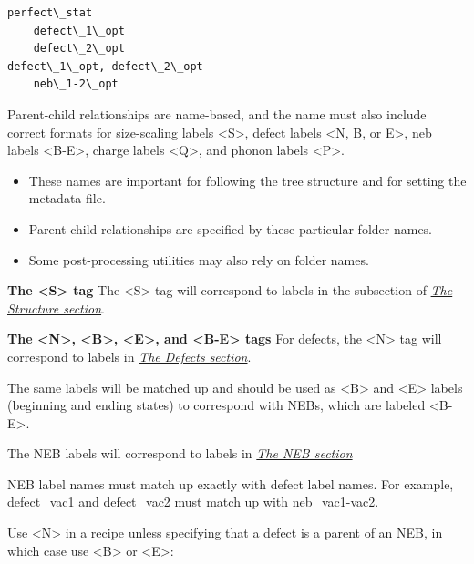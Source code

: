 \documentclass[letterpaper,10pt,english]{sphinxmanual}
\begin{document}
\begin{Verbatim}[commandchars=\\\{\}]
perfect\_stat
    defect\_1\_opt
    defect\_2\_opt
defect\_1\_opt, defect\_2\_opt
    neb\_1-2\_opt
\end{Verbatim}

Parent-child relationships are name-based, and the name must also include correct formats for size-scaling labels \textless{}S\textgreater{}, defect labels \textless{}N, B, or E\textgreater{}, neb labels \textless{}B-E\textgreater{}, charge labels \textless{}Q\textgreater{}, and phonon labels \textless{}P\textgreater{}.
\begin{itemize}
\item {} 
These names are important for following the tree structure and for setting the metadata file.

\item {} 
Parent-child relationships are specified by these particular folder names.

\item {} 
Some post-processing utilities may also rely on folder names.

\end{itemize}

\textbf{The \textless{}S\textgreater{} tag}
The \textless{}S\textgreater{} tag will correspond to labels in the  subsection of {\hyperref[3_1_1_structure::doc]{\emph{The Structure section}}}.

\textbf{The \textless{}N\textgreater{}, \textless{}B\textgreater{}, \textless{}E\textgreater{}, and \textless{}B-E\textgreater{} tags}
For defects, the \textless{}N\textgreater{} tag will correspond to labels in {\hyperref[3_1_5_defects::doc]{\emph{The Defects section}}}.

The same labels will be matched up and should be used as \textless{}B\textgreater{} and \textless{}E\textgreater{} labels (beginning and ending states) to correspond with NEBs, which are labeled \textless{}B-E\textgreater{}.

The NEB labels will correspond to labels in {\hyperref[3_1_6_neb::doc]{\emph{The NEB section}}}

NEB label names must match up exactly with defect label names. For example, defect\_vac1 and defect\_vac2 must match up with neb\_vac1-vac2.

Use \textless{}N\textgreater{} in a recipe unless specifying that a defect is a parent of an NEB, in which case use \textless{}B\textgreater{} or \textless{}E\textgreater{}:
\end{document}
